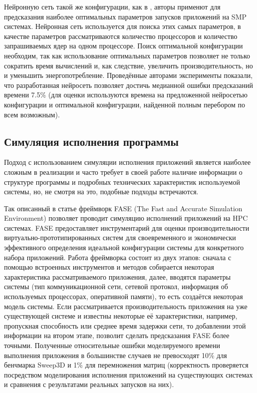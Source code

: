 		Нейронную сеть такой же конфигурации, как в \cite{ML_SMG2000}, авторы \cite{ML_PROC_KERN} применют для предсказания наиболее оптимальных параметров запусков приложений на SMP системах. Нейронная сеть используется для поиска этих самых параметров, в качестве параметров рассматриваются количество процессоров и количество запрашиваемых ядер на одном процессоре. Поиск оптимальной конфигурации необходим, так как использование оптимальных параметров позволяет не только сократить время вычислений и, как следствие, увеличить производительность, но и уменьшить энергопотребление. Проведённые авторами эксперименты показали, что разработанная нейросеть позволяет достичь медианной ошибки предсказаний времени 7.5\% (для оценки используются времена на предложенной нейросетью конфигурации и оптимальной конфигурации, найденной полным перебором по всем возможным).

	\subsection{Симуляция исполнения программы}
		Подход с использованием симуляции исполнения приложений является наиболее сложным в реализации и часто требует в своей работе наличие информации о структуре программы и подробных технических характеристик используемой системы, но, не смотря на это, подобные подходы встречаются.

		Так описанный в статье \cite{simulation_FASE} фреймворк FASE (The Fast and Accurate Simulation Environment) позволяет проводит симуляцию исполнений приложений на HPC системах. FASE предоставляет инструментарий для оценки производительности виртуально-прототипированных систем для своевременного и экономически эффективного определения идеальной конфигурации системы для конкретного набора приложений. Работа фреймворка состоит из двух этапов: сначала с помощью встроенных инструментов и методов собирается некоторая характеристика рассматриваемого приложения, далее, вводятся параметры системы (тип коммуникационной сети, сетевой протокол, информация об используемых процессорах, оперативной памяти), то есть создаётся некоторая модель системы. Если рассматривается производительность приложения на уже существующей системе и известны некоторые её характеристики, например, пропускная способность или среднее время задержки сети, то добавлении этой информации на втором этапе, позволит сделать предсказания FASE более точными. Полученные относительные ошибки моделируемого времени выполнения приложения в большинстве случаев не превосходят 10\% для бенчмарка Sweep3D и 1\% для перемножения матриц (корректность проверяется посредством моделирования исполнения приложений на существующих системах и сравнения с результатами реальных запусков на них).
		
